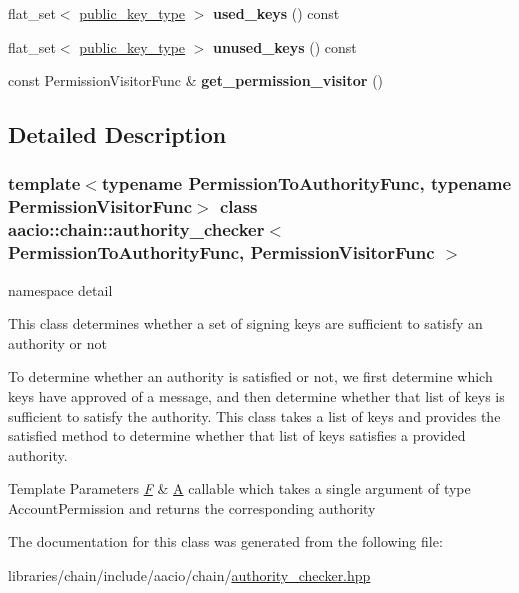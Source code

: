 \begin{DoxyCompactItemize}
flat\+\_\+set$<$ \mbox{\hyperlink{classfc_1_1crypto_1_1public__key}{public\+\_\+key\+\_\+type}} $>$ {\bfseries used\+\_\+keys} () const
\item 
\mbox{\label{classaacio_1_1chain_1_1authority__checker_a0b00454d0d443561ad15ecf8f82eafd2}} 
flat\+\_\+set$<$ \mbox{\hyperlink{classfc_1_1crypto_1_1public__key}{public\+\_\+key\+\_\+type}} $>$ {\bfseries unused\+\_\+keys} () const
\item 
\mbox{\label{classaacio_1_1chain_1_1authority__checker_aa6a80ad633c9546c897fcc4519f59f43}} 
const Permission\+Visitor\+Func \& {\bfseries get\+\_\+permission\+\_\+visitor} ()
\end{DoxyCompactItemize}


\subsection{Detailed Description}
\subsubsection*{template$<$typename Permission\+To\+Authority\+Func, typename Permission\+Visitor\+Func$>$\newline
class aacio\+::chain\+::authority\+\_\+checker$<$ Permission\+To\+Authority\+Func, Permission\+Visitor\+Func $>$}

namespace detail 

This class determines whether a set of signing keys are sufficient to satisfy an authority or not

To determine whether an authority is satisfied or not, we first determine which keys have approved of a message, and then determine whether that list of keys is sufficient to satisfy the authority. This class takes a list of keys and provides the satisfied method to determine whether that list of keys satisfies a provided authority.


\begin{DoxyTemplParams}{Template Parameters}
{\em \mbox{\hyperlink{struct_f}{F}}} & \mbox{\hyperlink{struct_a}{A}} callable which takes a single argument of type Account\+Permission and returns the corresponding authority \\
\hline
\end{DoxyTemplParams}


The documentation for this class was generated from the following file\+:\begin{DoxyCompactItemize}
\item 
libraries/chain/include/aacio/chain/\mbox{\hyperlink{authority__checker_8hpp}{authority\+\_\+checker.\+hpp}}\end{DoxyCompactItemize}
